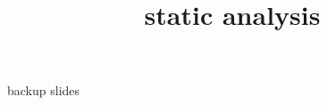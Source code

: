 \graphicspath{{./figures/}}
\title{static analysis}
\date{}

\begin{frame}
    \titlepage
\end{frame}





\begin{frame}{backup slides}
\end{frame}




